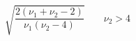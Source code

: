 

\[
\sqrt{\frac{2(\nu_{1} + \nu_{2} - 2)} {\nu_{1}(\nu_{2} - 4)}} \;\;\;\;\;\;\; \nu_{2} > 4
\]



